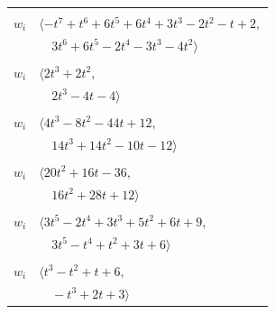 \documentclass[11pt]{article}
\begin{document}
\begin{longtable}{@{}ll@{}}
\addlinespace[2pt]
\multicolumn{2}{@{}p{0.97\textwidth}@{}}{$i=11$, $D_i=1$, $\rho_{ij}$: $2{:}2, \allowbreak 3{:}2, \allowbreak 4{:}2, \allowbreak 6{:}1, \allowbreak 20{:}1, \allowbreak 22{:}1, \allowbreak 25{:}2, \allowbreak 28{:}1, \allowbreak 33{:}2$}\\
$w_i$ & $\langle -t^{7}+t^{6}+6t^{5}+6t^{4}+3t^{3}-2t^{2}-t+2,$\\
 & $\quad 3t^{6}+6t^{5}-2t^{4}-3t^{3}-4t^{2}\rangle$\\
\addlinespace[2pt]
\multicolumn{2}{@{}p{0.97\textwidth}@{}}{$i=12$, $D_i=1$, $\rho_{ij}$: $0{:}2, \allowbreak 3{:}1, \allowbreak 14{:}1, \allowbreak 19{:}2, \allowbreak 21{:}1, \allowbreak 24{:}2, \allowbreak 31{:}1$}\\
$w_i$ & $\langle 2t^{3}+2t^{2},$\\
 & $\quad 2t^{3}-4t-4\rangle$\\
\addlinespace[2pt]
\multicolumn{2}{@{}p{0.97\textwidth}@{}}{$i=13$, $D_i=1$, $\rho_{ij}$: $2{:}2, \allowbreak 3{:}1, \allowbreak 4{:}2, \allowbreak 9{:}1, \allowbreak 16{:}1, \allowbreak 18{:}2, \allowbreak 22{:}1, \allowbreak 29{:}2, \allowbreak 33{:}2$}\\
$w_i$ & $\langle 4t^{3}-8t^{2}-44t+12,$\\
 & $\quad 14t^{3}+14t^{2}-10t-12\rangle$\\
\addlinespace[2pt]
\multicolumn{2}{@{}p{0.97\textwidth}@{}}{$i=14$, $D_i=1$, $\rho_{ij}$: $6{:}2, \allowbreak 8{:}2, \allowbreak 12{:}2, \allowbreak 22{:}2, \allowbreak 24{:}2, \allowbreak 30{:}1, \allowbreak 31{:}1$}\\
$w_i$ & $\langle 20t^{2}+16t-36,$\\
 & $\quad 16t^{2}+28t+12\rangle$\\
\addlinespace[2pt]
\multicolumn{2}{@{}p{0.97\textwidth}@{}}{$i=15$, $D_i=1$, $\rho_{ij}$: $1{:}1, \allowbreak 7{:}2, \allowbreak 9{:}1, \allowbreak 16{:}1, \allowbreak 18{:}1, \allowbreak 19{:}2, \allowbreak 24{:}1, \allowbreak 31{:}2$}\\
$w_i$ & $\langle 3t^{5}-2t^{4}+3t^{3}+5t^{2}+6t+9,$\\
 & $\quad 3t^{5}-t^{4}+t^{2}+3t+6\rangle$\\
\addlinespace[2pt]
\multicolumn{2}{@{}p{0.97\textwidth}@{}}{$i=16$, $D_i=1$, $\rho_{ij}$: $3{:}2, \allowbreak 13{:}2, \allowbreak 15{:}2, \allowbreak 18{:}1, \allowbreak 24{:}1, \allowbreak 29{:}2, \allowbreak 30{:}1$}\\
$w_i$ & $\langle t^{3}-t^{2}+t+6,$\\
 & $\quad -t^{3}+2t+3\rangle$\\

\end{longtable}
\end{document}
